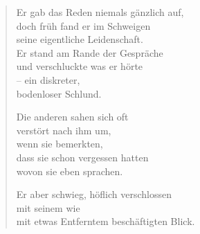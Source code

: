 

\begin{verse}
Er gab das Reden niemals gänzlich auf,\\
doch früh fand er im Schweigen\\
seine eigentliche Leidenschaft.\\
Er stand am Rande der Gespräche\\
und verschluckte was er hörte\\
-- ein diskreter,\\
bodenloser Schlund.

Die anderen sahen sich oft\\
verstört nach ihm um,\\
wenn sie bemerkten,\\
dass sie schon vergessen hatten\\
wovon sie eben sprachen.

Er aber schwieg, höflich verschlossen\\
mit seinem wie\\
mit etwas Entferntem beschäftigten Blick.
\end{verse}
